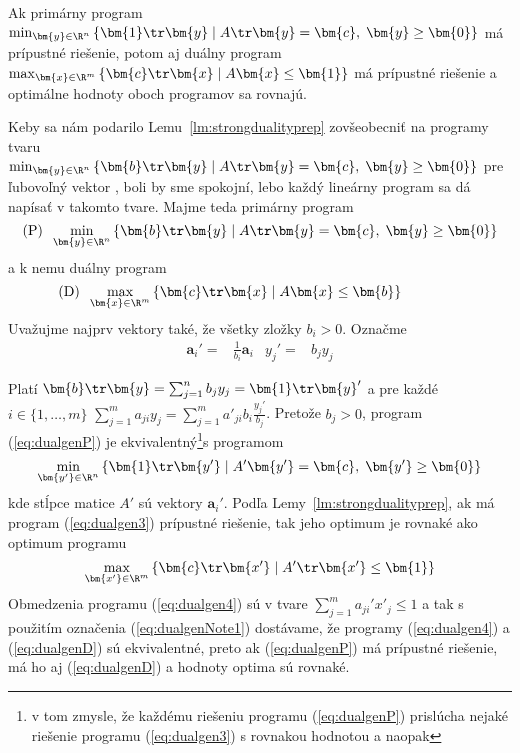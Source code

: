 \begin{lema}
  \label{lm:strongdualityprep}
  Ak primárny program $\min_{\bm{y}\in\R^n}\left\{ \bm{1}\tr\bm{y} \mid A\tr\bm{y}=\bm{c},\;\bm{y}\ge\bm{0}\right\}$
má prípustné riešenie, potom aj duálny program 
$\max_{\bm{x}\in\R^m}\left\{ \bm{c}\tr\bm{x} \mid A\bm{x}\le\bm{1}\right\}$
má prípustné riešenie a optimálne hodnoty oboch programov sa rovnajú.
\end{lema}

\noindent
Keby sa nám podarilo Lemu~\ref{lm:strongdualityprep}
zovšeobecniť na programy tvaru  
$\min_{\bm{y}\in\R^n}\left\{ \bm{b}\tr\bm{y} \mid A\tr\bm{y}=\bm{c},\;\bm{y}\ge\bm{0}\right\}$
pre ľubovoľný vektor ,
boli by sme spokojní, lebo každý lineárny program sa dá napísať v takomto tvare. 
Majme teda primárny program
\begin{equation}
  \label{eq:dualgenP}
  \text{(P)}\;\; \min_{\bm{y}\in\R^n}\left\{ \bm{b}\tr\bm{y} \mid A\tr\bm{y}=\bm{c},\;\bm{y}\ge\bm{0}\right\}
\end{equation}
a k nemu duálny program
\begin{equation}
  \label{eq:dualgenD}
  \text{(D)}\;\;\max_{\bm{x}\in\R^m}\left\{ \bm{c}\tr\bm{x} \mid A\bm{x}\le\bm{b}\right\}\hspace*{10ex}
\end{equation}
\noindent
Uvažujme najprv vektory  také, že všetky zložky $b_i>0$.
Označme 
\begin{align}
  \label{eq:dualgenNote1}
  \bm{a}_i'=&\frac{1}{b_i}\bm{a}_i & y_j'=&b_jy_j 
\end{align}

\noindent
Platí $\bm{b}\tr\bm{y}=\sum_{j=1}^nb_jy_j=\bm{1}\tr\bm{y}'$ a pre každé $i\in\{1,\ldots,m\}$
$\sum_{j=1}^ma_{ji}y_j=\sum_{j=1}^ma'_{ji}b_i\frac{y_j'}{b_j}$. Pretože $b_j>0$,  program (\ref{eq:dualgenP})
je ekvivalentný\footnote{v tom zmysle, že každému riešeniu programu (\ref{eq:dualgenP}) prislúcha nejaké riešenie 
programu (\ref{eq:dualgen3}) s rovnakou hodnotou a naopak}s programom
\begin{equation}
  \label{eq:dualgen3}
  \min_{\bm{y'}\in\R^n}\left\{ \bm{1}\tr\bm{y'} \mid A'\bm{y'}=\bm{c},\;\bm{y'}\ge\bm{0}\right\} 
\end{equation}
kde stĺpce matice  $A'$ sú vektory $\bm{a}_i'$.
Podľa Lemy~\ref{lm:strongdualityprep}, ak má program (\ref{eq:dualgen3}) prípustné riešenie, tak jeho optimum
je rovnaké ako optimum programu
\begin{equation}
  \label{eq:dualgen4}
  \max_{\bm{x'}\in\R^m}\left\{ \bm{c}\tr\bm{x'}\mid {A'}\tr\bm{x'}\le\bm{1}\right\}
 \end{equation}
 Obmedzenia programu (\ref{eq:dualgen4}) sú v tvare $\sum_{j=1}^ma_{ji}'x'_j\le1$ a tak s použitím
 označenia (\ref{eq:dualgenNote1}) dostávame, že programy (\ref{eq:dualgen4}) a (\ref{eq:dualgenD}) sú ekvivalentné,
 preto ak (\ref{eq:dualgenP}) má prípustné riešenie, má ho aj (\ref{eq:dualgenD}) a hodnoty optima sú rovnaké.

